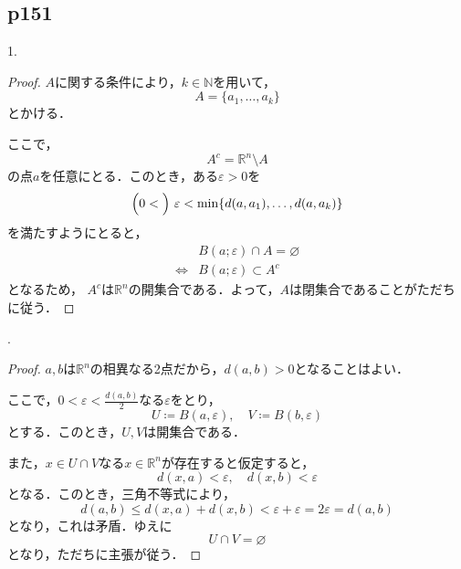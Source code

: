 \documentclass[dvipdfmx,uplatex,11pt]{jsarticle}
\begin{document}
\subsection{p151}
1.
\begin{leftbar}
    \begin{proof}
        $A$に関する条件により，$k \in \mathbb{N}$を用いて，
        \[
            A = \{a_1  , \dots , a_k\}
        \]
        とかける．

        ここで，
        \[
            A^c = \mathbb{R}^n \setminus A
        \]
        の点$a$を任意にとる．このとき，ある$\varepsilon >0$を
        \[
             \Bigl (0< \Bigl) ~ \varepsilon < \min \{ d(a,a_1),\dots,d(a,a_k)\}
        \]
        を満たすようにとると，
        \begin{align*}
            & B(a;\varepsilon) \cap A = \varnothing \\
            \iff & B (a;\varepsilon) \subset A^c
        \end{align*}
        となるため， $A^c$は$\mathbb{R}^n$の開集合である．よって，$A$は閉集合であることがただちに従う．
    \end{proof}
\end{leftbar}
.
\begin{leftbar}
    \begin{proof}
    $a,b$は$\mathbb{R}^n$の相異なる2点だから，$d(a,b)>0$となることはよい．

    ここで，$0< \varepsilon < \frac{d(a,b)}{2}$なる$\varepsilon$をとり，
    \[
        U \coloneqq B(a,\varepsilon),\quad V \coloneqq B (b,\varepsilon)
    \]
    とする．このとき，$U,V$は開集合である．
    
    また，$x \in U \cap V$なる$x \in \mathbb{R}^n$が存在すると仮定すると，
    \[
        d(x,a)<\varepsilon ,\quad d(x,b)<\varepsilon
    \]
    となる．このとき，三角不等式により，
    \[
        d(a,b)  \le d(x,a)+d(x,b) <\varepsilon + \varepsilon = 2 \varepsilon = d(a,b)
    \]
    となり，これは矛盾．ゆえに
    \[
        U \cap V = \varnothing 
    \]
    となり，ただちに主張が従う．
    \end{proof}
\end{leftbar}
\end{document}
